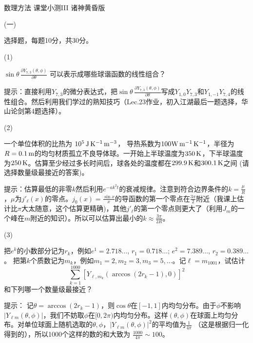 \documentclass[12pt,CJK]{article}
\begin{document}
\bch
{\large 数理方法 课堂小测III 诸神黄昏版}

{\vskip 0.2in}

\bitem
\item[(一)]{选择题，每题10分，共30分。

  \bitem

\item[(1)]{ $\sin\theta \,\frac{\partial Y_{7,3}(\theta,\phi)}{\partial \theta} $ 可以表示成哪些球谐函数的线性组合？ 
  

  {\red 提示：直接利用$Y_{7,3}$的微分表达式，把$\sin\theta \,\frac{\partial Y_{7,3}(\theta,\phi)}{\partial \theta} $写成$Y_{1,0}Y_{7,3}$和$Y_{1,-1}Y_{7,4}$的线性组合。然后利用我们学过的熟知技巧（Lec.23作业，初入江湖最后一题选择，华山论剑第4题选择）。}
}
  
\item[(2)]{ 一个单位体积的比热为 $ 10^5 \,\mathrm{J} \,\mathrm{K}^{-1}\,\mathrm{m}^{-3}$， 导热系数为$100\mathrm{W}\,\mathrm{m}^{-1}\,\mathrm{K}^{-1}$，半径为$R=0.1\,\mathrm{m}$的均匀材质孤立不良导体球。一开始上半球温度为$350\,\mathrm{K}$，下半球温度为$250\,\mathrm{K}$。估算至少经过多长时间后，球各处的温度都在$299.9\,\mathrm{K}$和$300.1\,\mathrm{K}$之间 (请选择数量级最接近的答案)。 

  \optlist{$0.003\SIs$}{$ 0.1\SIs$}{{\blue $3\SIs$}}{$90\SIs$}

  {\red 提示：估算最低的非零$k$然后利用$e^{-ak^2t}$的衰减规律。注意到符合边界条件的$k=\frac{\mu}{R}$，$\mu$为$j'_\ell(x)$的零点。$j_0(x) = \frac{\sin x}{x}$的导函数的第一个零点在$\frac{3\pi}{2}$附近（我课上估计比$\pi$大太随意，这个估算更精确)，其他$j'_\ell$的第一个零点则更大了（利用$J_m$的一个峰在$m$附近的知识）。所以可以估算出最小的$k\approx \frac{3\pi}{2R}$。}
}
  

\item[(3)]{把$e^k$的小数部分记为$r_k$，例如$e^1= 2.718\ldots$, $r_1 = 0.718\ldots$; $e^2=7.389\ldots$, $r_2=0.389\ldots$。
  把第$k$个质数记为$m_k$，例如$m_1=2, m_2=3, m_3=5, \ldots$。记$\ell = m_{1001}$，试估计
  $$\sum_{k=1}^{1000} \left[ Y_{\ell, m_k }\left(\arccos (2r_k-1) , 0\right)\right] ^2$$
  和下列哪一个数量级最接近？ 


  {\red 提示： 记$\theta = \arccos(2r_k-1)$，则$\cos\theta$在$[-1,1]$内均匀分布。由于$\phi$不影响$|Y_{\ell m}(\theta,\phi)|$，我们不妨取$\phi$在$[0,2\pi)$内均匀分布。这样$(\theta,\phi)$在球面上均匀分布。对单位球面上随机选取的$\theta,\phi$，$|Y_{\ell m}(\theta,\phi)|^2$的平均值为$\frac{1}{4\pi}$ （这是根据归一化得到的），所以1000个这样的数的和大致为 $\frac{1000}{4\pi}\sim 100$。}
}

  \eitem  
}
\end{document}
